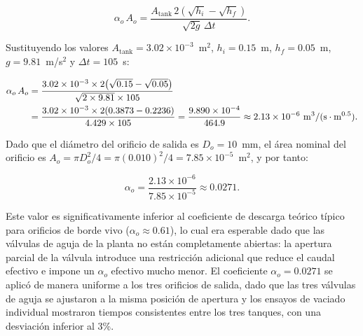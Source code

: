 \documentclass[12pt,letterpaper]{article}
\begin{document}
\begin{equation}
\alpha_o\,A_o = \frac{A_{\mathrm{tank}}\,2\!\left(\sqrt{h_i} - 
\sqrt{h_f}\right)}{\sqrt{2g}\,\Delta t}.
\label{eq:calibracion_ao}
\end{equation}

Sustituyendo los valores $A_{\mathrm{tank}} = 3.02 \times 10^{-3}$~m$^2$, 
$h_i = 0.15$~m, $h_f = 0.05$~m, $g = 9.81$~m/s$^2$ y $\Delta t = 
105$~s:

\begin{align}
\alpha_o\,A_o
  &= \frac{3.02\times10^{-3} \times 2\!\left(\sqrt{0.15}-\sqrt{0.05}\right)}
          {\sqrt{2 \times 9.81} \times 105} \notag \\
  &= \frac{3.02\times10^{-3} \times 2(0.3873 - 0.2236)}{4.429 \times 105}
   = \frac{9.890\times10^{-4}}{464.9}
   \approx 2.13\times10^{-6}~\mathrm{m}^{3}/(\mathrm{s}\cdot\mathrm{m}^{0.5}).
\end{align}

Dado que el diámetro del orificio de salida es $D_o = 10$~mm, el área 
nominal del orificio es $A_o = \pi D_o^2 / 4 = \pi(0.010)^2/4 = 7.85 
\times 10^{-5}$~m$^2$, y por tanto:

\begin{equation}
\alpha_o = \frac{2.13\times10^{-6}}{7.85\times10^{-5}} \approx 0.0271.
\label{eq:alphao_resultado}
\end{equation}

Este valor es significativamente inferior al coeficiente de descarga 
teórico típico para orificios de borde vivo ($\alpha_o \approx 0.61$), lo 
cual era esperable dado que las válvulas de aguja de la planta no están 
completamente abiertas: la apertura parcial de la válvula introduce una 
restricción adicional que reduce el caudal efectivo e impone un 
$\alpha_o$ efectivo mucho menor. El coeficiente $\alpha_o = 0.0271$ se 
aplicó de manera uniforme a los tres orificios de salida, dado que las 
tres válvulas de aguja se ajustaron a la misma posición de apertura y los 
ensayos de vaciado individual mostraron tiempos consistentes entre los 
tres tanques, con una desviación inferior al 3\%.
\end{document}
